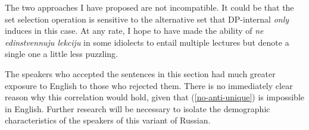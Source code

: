 The two approaches I have proposed are not incompatible. It could be that the set selection operation is sensitive to the alternative set that DP-internal \textit{only} induces in this case. At any rate, I hope to have made the ability of \textit{ne edinstvennuju lekciju} in some idiolects to entail multiple lectures but denote a single one a little less puzzling.

The speakers who accepted the sentences in this section had much greater exposure to English to those who rejected them. There is no immediately clear reason why this correlation would hold, given that (\ref{no-anti-unique}) is impossible in English. Further research will be necessary to isolate the demographic characteristics of the speakers of this variant of Russian.
